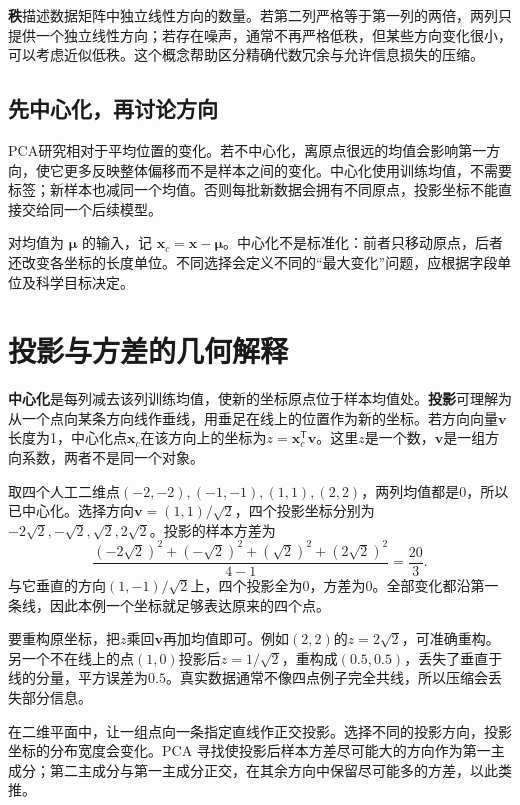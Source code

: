 \textbf{秩}描述数据矩阵中独立线性方向的数量。若第二列严格等于第一列的两倍，两列只提供一个独立线性方向；若存在噪声，通常不再严格低秩，但某些方向变化很小，可以考虑近似低秩。这个概念帮助区分精确代数冗余与允许信息损失的压缩。

\subsection{先中心化，再讨论方向}
PCA研究相对于平均位置的变化。若不中心化，离原点很远的均值会影响第一方向，使它更多反映整体偏移而不是样本之间的变化。中心化使用训练均值，不需要标签；新样本也减同一个均值。否则每批新数据会拥有不同原点，投影坐标不能直接交给同一个后续模型。

对均值为 $\boldsymbol\mu$ 的输入，记 $\mathbf x_c=\mathbf x-\boldsymbol\mu$。中心化不是标准化：前者只移动原点，后者还改变各坐标的长度单位。不同选择会定义不同的“最大变化”问题，应根据字段单位及科学目标决定。

\section{投影与方差的几何解释}

\textbf{中心化}是每列减去该列训练均值，使新的坐标原点位于样本均值处。\textbf{投影}可理解为从一个点向某条方向线作垂线，用垂足在线上的位置作为新的坐标。若方向向量$\mathbf v$长度为1，中心化点$\mathbf x_c$在该方向上的坐标为$z=\mathbf x_c^{\mathsf T}\mathbf v$。这里$z$是一个数，$\mathbf v$是一组方向系数，两者不是同一个对象。

取四个人工二维点$(-2,-2),(-1,-1),(1,1),(2,2)$，两列均值都是0，所以已中心化。选择方向$\mathbf v=(1,1)/\sqrt2$，四个投影坐标分别为$-2\sqrt2,-\sqrt2,\sqrt2,2\sqrt2$。投影的样本方差为
\[
\frac{(-2\sqrt2)^2+(-\sqrt2)^2+(\sqrt2)^2+(2\sqrt2)^2}{4-1}=\frac{20}{3}.
\]
与它垂直的方向$(1,-1)/\sqrt2$上，四个投影全为0，方差为0。全部变化都沿第一条线，因此本例一个坐标就足够表达原来的四个点。


要重构原坐标，把$z$乘回$\mathbf v$再加均值即可。例如$(2,2)$的$z=2\sqrt2$，可准确重构。另一个不在线上的点$(1,0)$投影后$z=1/\sqrt2$，重构成$(0.5,0.5)$，丢失了垂直于线的分量，平方误差为$0.5$。真实数据通常不像四点例子完全共线，所以压缩会丢失部分信息。

在二维平面中，让一组点向一条指定直线作正交投影。选择不同的投影方向，投影坐标的分布宽度会变化。PCA 寻找使投影后样本方差尽可能大的方向作为第一主成分；第二主成分与第一主成分正交，在其余方向中保留尽可能多的方差，以此类推。

